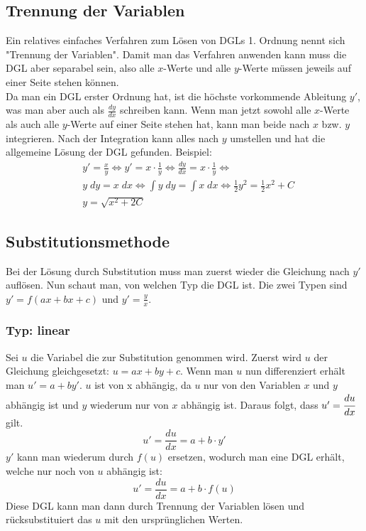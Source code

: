 \documentclass[a4paper,10pt]{scrartcl}
\begin{document}
        \subsection{Trennung der Variablen}
        Ein relatives einfaches Verfahren zum Lösen von DGLs 1. Ordnung nennt sich "Trennung der Variablen". Damit man das Verfahren anwenden kann muss die DGL aber
        separabel sein, also alle \(x\)-Werte und alle \(y\)-Werte müssen jeweils auf einer Seite stehen können. \\
        Da man ein DGL erster Ordnung hat, ist die höchste vorkommende Ableitung \(y'\), was man aber auch als \(\frac{dy}{dx}\) schreiben kann. Wenn man jetzt sowohl alle 
        \(x\)-Werte als auch alle \(y\)-Werte auf einer Seite stehen hat, kann man beide nach \(x\) bzw. \(y\) integrieren. Nach der Integration kann alles nach \(y\) umstellen
        und hat die allgemeine Lösung der DGL gefunden. Beispiel:
        \begin{equation}
            \begin{aligned}  
            & y' = \frac{x}{y} \Leftrightarrow y' = x \cdot \frac{1}{y} \Leftrightarrow \frac{dy}{dx} = x \cdot \frac{1}{y}  \Leftrightarrow \\
            & y \; dy = x \; dx  \Leftrightarrow \int y \; dy = \int x \; dx \Leftrightarrow \frac{1}{2} y^2 = \frac{1}{2} x^2 + C \\
            & y = \sqrt{x^2 + 2C}
            \end{aligned}  
        \end{equation}
        
        \subsection{Substitutionsmethode}
        Bei der Lösung durch Substitution muss man zuerst wieder die Gleichung nach \(y'\) auflösen. Nun schaut man, von welchen Typ die DGL ist.
        Die zwei Typen sind \(y' = f(ax + bx + c)\) und \(y' = \frac{y}{x}\).
        \subsubsection{Typ: linear}
        Sei \(u\) die Variabel die zur Substitution genommen wird. Zuerst wird \(u\) der Gleichung gleichgesetzt: \(u = ax + by +c\). Wenn man \(u\) nun
        differenziert erhält man \(u' = a + by'\). \(u\) ist von x abhängig, da \(u\) nur von den Variablen \(x\) und \(y\) abhängig ist und \(y\) wiederum 
        nur von \(x\) abhängig ist. Daraus folgt, dass \(u' = \cfrac{du}{dx}\) gilt. 
        \begin{equation}
            u' = \frac{du}{dx} = a + b \cdot y'
        \end{equation}
        \(y'\) kann man wiederum durch \(f(u)\) ersetzen, wodurch man eine DGL erhält, welche nur noch von \(u\) abhängig ist: 
        \begin{equation}
            u' = \frac{du}{dx} = a + b \cdot f(u)
        \end{equation}
        Diese DGL kann man dann durch Trennung der Variablen lösen und rücksubstituiert das \(u\) mit den ursprünglichen Werten.
\end{document}

